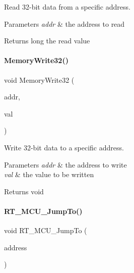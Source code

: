 Read 32-\/bit data from a specific address. 


\begin{DoxyParams}{Parameters}
{\em addr} & the address to read \\
\hline
\end{DoxyParams}
\begin{DoxyReturn}{Returns}
long the read value 
\end{DoxyReturn}
\mbox{\label{a00020_ad9953f631a539cfaa35baf94f878b3ec}} 
\paragraph{\texorpdfstring{Memory\+Write32()}{MemoryWrite32()}}
{\footnotesize\ttfamily void Memory\+Write32 (\begin{DoxyParamCaption}\item[{\mbox{\hyperlink{a00020_a06da901348542a481c297d9b700e2001}{memory\+\_\+addr\+\_\+t}}}]{addr,  }\item[{uint32\+\_\+t}]{val }\end{DoxyParamCaption})\hspace{0.3cm}{\ttfamily [inline]}}



Write 32-\/bit data to a specific address. 


\begin{DoxyParams}{Parameters}
{\em addr} & the address to write \\
\hline
{\em val} & the value to be written \\
\hline
\end{DoxyParams}
\begin{DoxyReturn}{Returns}
void 
\end{DoxyReturn}
\mbox{\label{a00020_a81b750927e5dc24f1595c15e7dd7bdf5}} 
\paragraph{\texorpdfstring{R\+T\+\_\+\+M\+C\+U\+\_\+\+Jump\+To()}{RT\_MCU\_JumpTo()}}
{\footnotesize\ttfamily void R\+T\+\_\+\+M\+C\+U\+\_\+\+Jump\+To (\begin{DoxyParamCaption}\item[{\mbox{\hyperlink{a00020_a06da901348542a481c297d9b700e2001}{memory\+\_\+addr\+\_\+t}}}]{address }\end{DoxyParamCaption})\hspace{0.3cm}{\ttfamily [inline]}}



